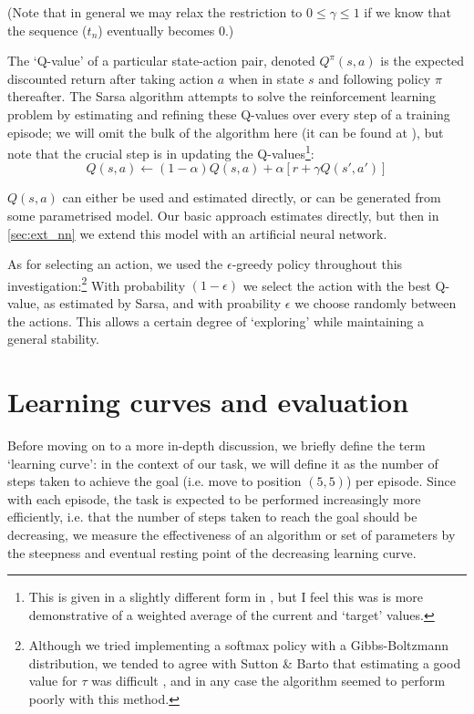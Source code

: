 \documentclass[a4paper, 11pt, twocolumn, final]{article} %
\begin{document}
(Note that in general we may relax the restriction to $0 \le \gamma \le 1$ if we
know that the sequence ($t_n$) eventually becomes 0.)

The `Q-value' of a particular state-action pair, denoted $Q^\pi(s, a)$ is the
expected discounted return after taking action $a$ when in state $s$ and
following policy $\pi$ thereafter.  The Sarsa algorithm attempts to solve the
reinforcement learning problem by estimating and refining these Q-values over
every step of a training episode; we will omit the bulk of the algorithm here
(it can be found at \cite[p.~146]{Sutton1998}), but note that the crucial step
is in updating the Q-values\footnote{This is given in a slightly different form
in \cite{Sutton1998}, but I feel this was is more demonstrative of a weighted
average of the current and `target' values.}:
\begin{equation}
Q(s, a) \leftarrow (1-\alpha)Q(s, a) + \alpha[r + \gamma Q(s', a')]
\end{equation}

$Q(s, a)$ can either be used and estimated directly, or can be generated from
some parametrised model.  Our basic approach estimates directly, but then in
\autoref{sec:ext_nn} we extend this model with an artificial neural network.

As for selecting an action, we used the $\epsilon$-greedy policy throughout this
investigation:\footnote{Although we tried implementing a softmax policy with a
Gibbs-Boltzmann distribution, we tended to agree with Sutton \& Barto that
estimating a good value for $\tau$ was difficult \cite[p.~31]{Sutton1998}, and
in any case the algorithm seemed to perform poorly with this method.}  With
probability $(1-\epsilon)$ we select the action with the best Q-value, as
estimated by Sarsa, and with proability $\epsilon$ we choose randomly between
the actions.  This allows a certain degree of `exploring' while maintaining a
general stability.

\section{Learning curves and evaluation} Before moving on to a more in-depth
discussion, we briefly define the term `learning curve': in the context of our
task, we will define it as the number of steps taken to achieve the goal (i.e.
move to position $(5, 5)$) per episode.  Since with each episode, the task is
expected to be performed increasingly more efficiently, i.e. that the number of
steps taken to reach the goal should be decreasing, we measure the effectiveness
of an algorithm or set of parameters by the steepness and eventual resting point
of the decreasing learning curve.
\end{document}
